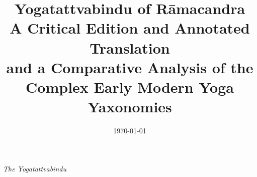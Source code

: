 %
%


\title{Yogatattvabindu of Rāmacandra\\ A Critical Edition and Annotated Translation\\ and a Comparative Analysis of the \\Complex Early Modern Yoga Yaxonomies }
\date{\today}

\parindent=15pt



\frontmatter
\thispagestyle{empty}
\begin{center}
  {\Large \emph{The Yogatattvabindu}}\\[3mm]
\end{center}



